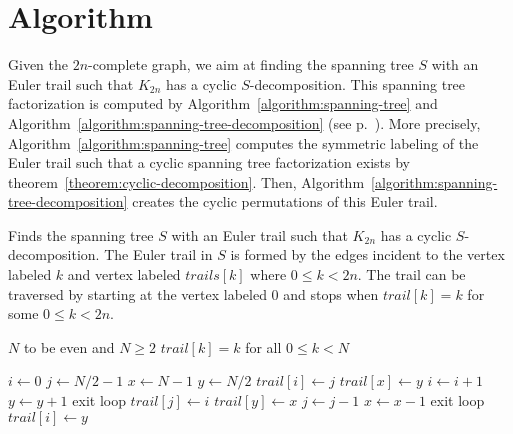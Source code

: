 \documentclass{article}
\begin{document}

\section{Algorithm}
 
Given the $2n$-complete graph, we aim at finding the spanning tree $S$ with an Euler trail such that $K_{2n}$ has a cyclic $S$-decomposition. This spanning tree factorization is computed by Algorithm~\ref{algorithm:spanning-tree} and Algorithm~\ref{algorithm:spanning-tree-decomposition} (see p.~\pageref{algorithm:spanning-tree-decomposition}). More precisely, Algorithm~\ref{algorithm:spanning-tree} computes the symmetric labeling of the Euler trail such that a cyclic spanning tree factorization exists by theorem~\eqref{theorem:cyclic-decomposition}. Then, Algorithm~\ref{algorithm:spanning-tree-decomposition} creates the cyclic permutations of this Euler trail.

\begin{algorithm}
\caption{Finds the spanning tree $S$ with an Euler trail such that $K_{2n}$ has a cyclic $S$-decomposition. The Euler trail in $S$ is formed by the edges incident to the vertex labeled $k$ and vertex labeled $trails[k]$ where $0 \leq k < 2n$. The trail can be traversed by starting at the vertex labeled $0$ and stops when $trail[k]=k$ for some  $0 \leq k < 2n$.}
\label{algorithm:spanning-tree}
\begin{algorithmic}
\REQUIRE $N$ to be even and $N \geq 2$
\REQUIRE $trail[k] = k$ for all $0 \leq k < N$

\STATE $i \leftarrow 0$
\STATE $j \leftarrow N / 2 - 1$
\STATE $x \leftarrow N - 1$
\STATE $y \leftarrow N / 2$
\LOOP
\STATE $trail[i] \leftarrow j$
\STATE $trail[x] \leftarrow y$
\STATE $i \leftarrow i + 1$
\STATE $y \leftarrow y + 1$
\STATE exit loop
\ENDIF
\STATE $trail[j] \leftarrow i$
\STATE $trail[y] \leftarrow x$
\STATE $j \leftarrow j - 1$
\STATE $x \leftarrow x - 1$
\STATE exit loop
\ENDIF
\ENDLOOP
{}
\STATE $trail[i] \leftarrow y$
\ENDIF
\end{algorithmic}
\end{algorithm}
\end{document}
